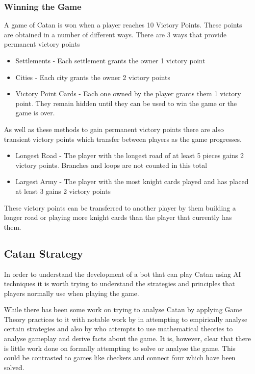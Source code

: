 \documentclass[]{article}
\begin{document}
\subsubsection{Winning the Game}
A game of Catan is won when a player reaches 10 Victory Points. These points are obtained in a number of different ways. There are 3 ways that provide permanent victory points

\begin{itemize}
	\item Settlements - Each settlement grants the owner 1 victory point
	\item Cities - Each city grants the owner 2 victory points
	\item Victory Point Cards - Each one owned by the player grants them 1 victory point. They remain hidden until they can be used to win the game or the game is over.
\end{itemize}

\par As well as these methods to gain permanent victory points there are also transient victory points which transfer between players as the game progresses.

\begin{itemize}
	\item Longest Road - The player with the longest road of at least 5 pieces gains 2 victory points. Branches and loops are not counted in this total
	\item Largest Army - The player with the most knight cards played and has placed at least 3 gains 2 victory points
\end{itemize}
 
 \par These victory points can be transferred to another player by them building a longer road or playing more knight cards than the player that currently has them.


\subsection{Catan Strategy}
In order to understand the development of a bot that can play Catan using AI techniques it is worth trying to understand the strategies and principles that players normally use when playing the game. 

\par While there has been some work on trying to analyse Catan by applying Game Theory practices to it with notable work  by \textcite{guhe2014game} in attempting to empirically analyse certain strategies and also by \textcite{keep2010} who attempts to use mathematical theories to analyse gameplay and derive facts about the game. It is, however, clear that there is little work done on formally attempting to solve or analyse the game. This could be contrasted to games like checkers and connect four which have been solved.
\end{document}
